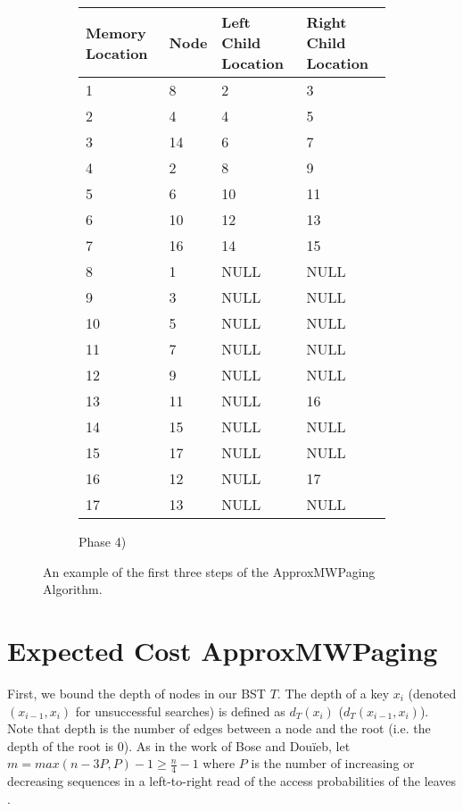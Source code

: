 \documentclass[letterpaper,12pt,titlepage,oneside,final]{book}
\theoremstyle{plain}
\begin{document}
\begin{figure}[H]
\begin{center}
\begin{subfigure}[b]{0.72\textwidth}
\begin{center}
    \begin{tabular}{ | l | l | l | p{5cm} |}
    \hline
    Memory Location & Node & Left Child Location & Right Child Location \\ \hline
    1  & 8  & 2    & 3    \\ \hline
    2  & 4  & 4    & 5    \\ \hline
    3  & 14 & 6    & 7    \\ \hline
    4  & 2  & 8    & 9    \\ \hline
    5  & 6  & 10   & 11   \\ \hline
    6  & 10 & 12   & 13   \\ \hline
    7  & 16 & 14   & 15   \\ \hline
    8  & 1  & NULL & NULL \\ \hline
    9  & 3  & NULL & NULL \\ \hline
    10 & 5  & NULL & NULL \\ \hline
    11 & 7  & NULL & NULL \\ \hline
    12 & 9  & NULL & NULL \\ \hline
    13 & 11 & NULL & 16   \\ \hline
    14 & 15 & NULL & NULL \\ \hline
    15 & 17 & NULL & NULL \\ \hline
    16 & 12 & NULL & 17   \\ \hline
    17 & 13 & NULL & NULL \\ \hline
    \end{tabular}
\end{center}

\caption{Phase 4)}
\end{subfigure}
\end{center}


\caption{An example of the first three steps of the ApproxMWPaging Algorithm.}
\end{figure}


\section{Expected Cost ApproxMWPaging} \label{45}

First, we bound the depth of nodes in our BST $T$. The depth of a key $x_i$ (denoted $(x_{i-1}, x_i)$ for unsuccessful searches) is defined as $d_T(x_i)$ ($d_T(x_{i-1},x_i)$). Note that depth is the number of edges between a node and the root (i.e. the depth of the root is $0$). As in the work of Bose and Dou\"{i}eb, let $m=max({n-3P,P})-1 \geq \frac{n}{4} - 1$ where $P$ is the number of increasing or decreasing sequences in a left-to-right read of the access probabilities of the leaves \cite{bose2009efficient}.
\end{document}
